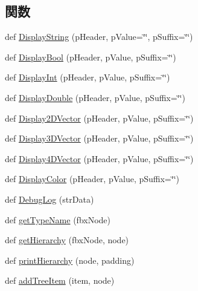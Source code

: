\subsection*{関数}
\begin{DoxyCompactItemize}
\item 
def \hyperlink{namespace_display_animation2_ad022ed8dee36f6dd02eaba9883652853}{Display\+String} (p\+Header, p\+Value=\char`\"{}\char`\"{}, p\+Suffix=\char`\"{}\char`\"{})
\item 
def \hyperlink{namespace_display_animation2_a68813e172bc7b686ec28958227464f4c}{Display\+Bool} (p\+Header, p\+Value, p\+Suffix=\char`\"{}\char`\"{})
\item 
def \hyperlink{namespace_display_animation2_a263f89ba2638bc6e1ced0f21129f1fd3}{Display\+Int} (p\+Header, p\+Value, p\+Suffix=\char`\"{}\char`\"{})
\item 
def \hyperlink{namespace_display_animation2_a8a3864b24299906008612750755eee0c}{Display\+Double} (p\+Header, p\+Value, p\+Suffix=\char`\"{}\char`\"{})
\item 
def \hyperlink{namespace_display_animation2_a2ebee84f14939b0a486e0dad6cafc77d}{Display2\+D\+Vector} (p\+Header, p\+Value, p\+Suffix=\char`\"{}\char`\"{})
\item 
def \hyperlink{namespace_display_animation2_ad0cd1a5d1ece0968b85d9df7fab75a36}{Display3\+D\+Vector} (p\+Header, p\+Value, p\+Suffix=\char`\"{}\char`\"{})
\item 
def \hyperlink{namespace_display_animation2_a330503186a98573ac890e41011691bf1}{Display4\+D\+Vector} (p\+Header, p\+Value, p\+Suffix=\char`\"{}\char`\"{})
\item 
def \hyperlink{namespace_display_animation2_a410fa311ed1b6776c408a4d165a875b1}{Display\+Color} (p\+Header, p\+Value, p\+Suffix=\char`\"{}\char`\"{})
\item 
def \hyperlink{namespace_display_animation2_aef2ff0ecd399db11128c7bbc2491c259}{Debug\+Log} (str\+Data)
\item 
def \hyperlink{namespace_display_animation2_acb58627435e7bf0ca9ae36af47a73fe6}{get\+Type\+Name} (fbx\+Node)
\item 
def \hyperlink{namespace_display_animation2_a88c4db3426ea3ee60268c8f151fa1690}{get\+Hierarchy} (fbx\+Node, node)
\item 
def \hyperlink{namespace_display_animation2_a47effc5cc9ce0276efafbef418b78ce3}{print\+Hierarchy} (node, padding)
\item 
def \hyperlink{namespace_display_animation2_a88987960702fdbd848aefa0eaf2a1e0c}{add\+Tree\+Item} (item, node)

\end{DoxyCompactItemize}
